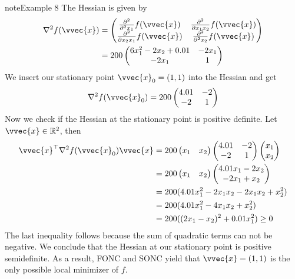 \documentclass[letterpaper,10pt,english]{jupyterBook}
\begin{document}
\begin{sphinxadmonition}{note}{Example 8}
\sphinxAtStartPar
The Hessian is given by
\begin{align*}
    \nabla^2 f(\vvec{x})&=  \begin{pmatrix}\frac{\partial^2}{\partial^2 x_1} f(\vvec{x}) & \frac{\partial^2}{\partial x_1x_2} f(\vvec{x})\\ \frac{\partial^2}{\partial x_2x_1}f(\vvec{x}) & \frac{\partial^2}{\partial^2 x_2} f(\vvec{x})\end{pmatrix}\\
    &=200\begin{pmatrix} 6x_1^2-2x_2 + 0.01& -2x_1\\ -2x_1 &1 \end{pmatrix}
\end{align*}
\sphinxAtStartPar
We insert our stationary point \(\vvec{x}_0=(1,1)\) into the Hessian and get
\begin{equation*}
\begin{split}\nabla^2f(\vvec{x}_0)= 200\begin{pmatrix} 4.01& -2\\ -2 & 1\end{pmatrix}\end{split}
\end{equation*}
Now we check if the Hessian at the stationary point is positive definite. Let \(\vvec{x}\in\mathbb{R}^2\), then
\begin{align*}
    \vvec{x}^\top \nabla^2f(\vvec{x}_0) \vvec{x} &= 200 \begin{pmatrix}x_1 & x_2\end{pmatrix} \begin{pmatrix}
     4.01& -2\\ -2 & 1
    \end{pmatrix}\begin{pmatrix}x_1\\x_2\end{pmatrix}\\
    &= 200\begin{pmatrix}x_1 & x_2\end{pmatrix} \begin{pmatrix}
    4.01x_1-2x_2\\ -2x_1+ x_2
    \end{pmatrix}\\
    &=200(4.01x_1^2 -2x_1x_2 -2x_1x_2 +x_2^2)\\
    &= 200(4.01x_1^2 -4x_1x_2 + x_2^2)\\
    &= 200((2x_1-x_2)^2 +0.01x_1^2) \geq 0
\end{align*}
\sphinxAtStartPar
The last inequality follows because the sum of quadratic terms can not be negative.
We conclude that the Hessian at our stationary point is positive semi\sphinxhyphen{}definite. As a result, FONC and SONC yield that \(\vvec{x}=(1,1)\) is the only possible local minimizer of \(f\).
\end{sphinxadmonition}
\end{document}
